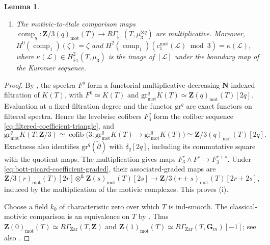 \documentclass[10pt]{amsart}
\newcommand{\gr}{\mathrm{gr}}
\newcommand{\Et}{\mathrm{\acute{E}t}}
\newcommand{\mot}{\operatorname{mot}}
\newtheorem{lemma}[lemma]{Lemma}
\theoremstyle{remark}
\begin{document}
\begin{lemma}
\begin{enumerate}[label=\textup{(\roman*)}]
		\item The motivic-to-\'etale comparison maps
		\(
		\operatorname{comp}_q\colon
		\mathbf Z/3(q)_{\mot}(T)\to
		R\Gamma_{\Et}(T,\mu_3^{\otimes q})
		\)
		are multiplicative. Moreover,
		\(H^0(\operatorname{comp}_1)(\zeta)=\zeta\) and
		\(H^2(\operatorname{comp}_1)
		(c_1^{\mot}(\mathcal L)\bmod3)=\kappa(\mathcal L)\), where
		\(\kappa(\mathcal L)\in H^2_{\Et}(T,\mu_3)\) is the image of
		\([\mathcal L]\) under the boundary map of the Kummer sequence.
	\end{enumerate}
\end{lemma}

\begin{proof}
	By \cite[Defs.~3.18 and~3.20, Prop.~4.46]
	{BouisMixedCharacteristicMotivicCohomology}, the spectra \(F^q\)
	form a functorial multiplicative decreasing \(\mathbf N\)-indexed
	filtration of \(K(T)\), with \(F^0\simeq K(T)\) and
	\(
	\gr^q_{\mot}K(T)\simeq\mathbf Z(q)_{\mot}(T)[2q]
	\). Evaluation at a fixed filtration degree and the functor \(\gr^q\)
	are exact functors on filtered spectra. Hence the levelwise cofibers
	\(F^q_3\) form the cofiber sequence
	\eqref{eq:filtered-coefficient-triangle}, and
	\begin{equation}\label{eq:bott-picard-coefficient-graded}
		\gr^q_{\mot}K(T;\mathbf Z/3)
		\simeq\operatorname{cofib}
		\bigl(3\colon\gr^q_{\mot}K(T)\to
		\gr^q_{\mot}K(T)\bigr)
		\simeq\mathbf Z/3(q)_{\mot}(T)[2q].
	\end{equation}
	Exactness also identifies \(\gr^q(\widetilde\partial)\) with
	\(\delta_q[2q]\), including its commutative square with the quotient
	maps. The multiplication gives maps
	\(F^r_3\wedge F^s\to F^{r+s}_3\). Under
	\eqref{eq:bott-picard-coefficient-graded}, their associated-graded maps
	are
	\[
	\mathbf Z/3(r)_{\mot}(T)[2r]\otimes^{\mathbf L}
	\mathbf Z(s)_{\mot}(T)[2s]\longrightarrow
	\mathbf Z/3(r+s)_{\mot}(T)[2r+2s],
	\]
	induced by the multiplication of the motivic complexes. This proves
	\textup{(i)}.
	
	Choose a field \(k_0\) of characteristic zero over which \(T\) is
	ind-smooth. The classical-motivic comparison is an equivalence on \(T\)
	by \cite[Thm.~6.1]{BouisKunduBL}. Thus
	\(
	\mathbf Z(0)_{\mot}(T)\simeq
	R\Gamma_{\mathrm{Zar}}(T,\mathbf Z)
	\) and
	\(
	\mathbf Z(1)_{\mot}(T)\simeq
	R\Gamma_{\mathrm{Zar}}(T,\mathbf G_m)[-1]
	\); see also \cite[Examples~3.4 and~3.5]
	{BouisMixedCharacteristicMotivicCohomology}.
	

\end{proof}
\end{document}
